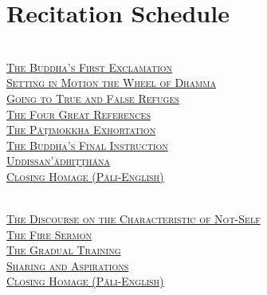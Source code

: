 \chapter{Recitation Schedule\makeatletter\hyperlink{endnote180-appendix}\makeatother}
\label{schedule}

{\centering

  {\libertinusFont\selectfont\textbf{\textsc{\fontsize{18}{12}\selectfont{}}}}\\

  \textsc{\fontsize{14.4}{28}\selectfont
    \hyperref[buddhas-first-exclamation]{The Buddha's First Exclamation} \ifdesktopversion\else\pageref{buddhas-first-exclamation}\fi\\
    \hyperref[wheel-of-dhamma-abridged]{Setting in Motion the Wheel of Dhamma} \ifdesktopversion\else\pageref{wheel-of-dhamma-abridged}\fi\\
    \hyperref[true-false-refuges]{Going to True and False Refuges} \ifdesktopversion\else\pageref{true-false-refuges}\fi\\
    \hyperref[four-great-references]{The Four Great References} \ifdesktopversion\else\pageref{four-great-references}\fi\\
    \hyperref[patimokkha-exhortation]{The Pāṭimokkha Exhortation} \ifdesktopversion\else\pageref{patimokkha-exhortation}\fi\\
    \hyperref[buddhas-final-instruction]{The Buddha's Final Instruction} \ifdesktopversion\else\pageref{buddhas-final-instruction}\fi\\
    \hyperref[uddissanadhitthana]{Uddissan'ādhiṭṭhāna} \ifdesktopversion\else\pageref{uddissanadhitthana}\fi\\
    \hyperref[closing-homage]{Closing Homage (Pāli-English)} \ifdesktopversion\else\pageref{closing-homage}\fi\\
  }

  \vspace{1.0cm}

  {\libertinusFont\selectfont\textbf{\textsc{\fontsize{18}{12}\selectfont{}}}}\\

  \textsc{\fontsize{14.4}{28}\selectfont
    \hyperref[characteristic-of-not-self]{The Discourse on the Characteristic of Not-Self} \ifdesktopversion\else\pageref{characteristic-of-not-self}\fi\\
    \hyperref[fire-sermon]{The Fire Sermon} \ifdesktopversion\else\pageref{fire-sermon}\fi\\
    \hyperref[gradual-training]{The Gradual Training} \ifdesktopversion\else\pageref{gradual-training}\fi\\
    \hyperref[sharing-aspirations]{Sharing and Aspirations} \ifdesktopversion\else\pageref{sharing-aspirations}\fi\\
    \hyperref[closing-homage]{Closing Homage (Pāli-English)} \ifdesktopversion\else\pageref{closing-homage}\fi\\
  }

}

